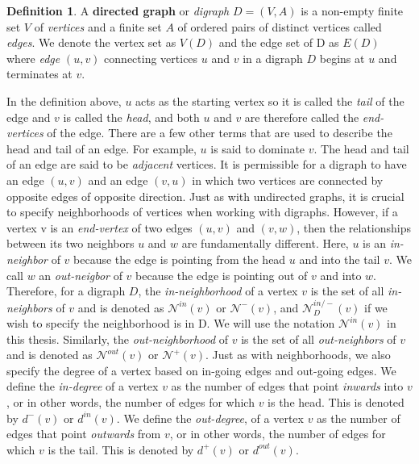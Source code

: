 \documentclass{Dissertate}
\theoremstyle{definition}
\theoremstyle{definition} %
\theoremstyle{definition}
\newtheorem{definition}[theorem]{Definition}
\begin{document}
\begin{definition}
    A \textbf{directed graph} or \textit{digraph} $D = (V, A)$ is a non-empty finite set $V$ of \textit{vertices} and a finite set $A$ of ordered pairs of distinct vertices called \textit{edges}. We denote the vertex set as $V(D)$ and the edge set of D as $E(D)$ where \textit{edge} $(u,v)$ connecting vertices $u$ and $v$ in a digraph $D$ begins at $u$ and terminates at $v$.
\end{definition}

In the definition above, $u$ acts as the starting vertex so it is called the \textit{tail} of the edge and $v$ is called the \textit{head}, and both $u$ and $v$ are therefore called the \textit{end-vertices} of the edge. There are a few other terms that are used to describe the head and tail of an edge. For example, $u$ is said to dominate $v$. The head and tail of an edge are said to be \textit{adjacent} vertices. It is permissible for a digraph to have an edge $(u,v)$ and an edge $(v,u)$ in which two vertices are connected by opposite edges of opposite direction. Just as with undirected graphs, it is crucial to specify neighborhoods of vertices when working with digraphs. However, if a vertex v is an \textit{end-vertex} of two edges $(u,v)$ and $(v,w)$, then the relationships between its two neighbors $u$ and $w$ are fundamentally different. Here, $u$ is an \textit{in-neighbor} of $v$ because the edge is pointing from the head $u$ and into the tail $v$. We call $w$ an \textit{out-neigbor} of $v$ because the edge is pointing out of $v$ and into $w$. Therefore, for a digraph $D$, the \textit{in-neighborhood} of a vertex $v$ is the set of all \textit{in-neighbors} of $v$ and is denoted as $\mathcal{N}^{in}(v)$ or $\mathcal{N}^{-}(v)$, and  $\mathcal{N}^{in/-}_D(v)$ if we wish to specify the neighborhood is in D. We will use the notation $\mathcal{N}^{in}(v)$ in this thesis. Similarly, the \textit{out-neighborhood} of $v$ is the set of all \textit{out-neighbors} of $v$ and is denoted as $\mathcal{N}^{out}(v)$ or $\mathcal{N}^{+}(v)$. Just as with neighborhoods, we also specify the degree of a vertex based on in-going edges and out-going edges. We define the \textit{in-degree} of a vertex $v$ as the number of edges that point \textit{inwards} into $v$, or in other words, the number of edges for which $v$ is the head. This is denoted by $d^{-}(v)$ or $d^{in}(v)$. We define the \textit{out-degree}, of a vertex $v$ as the number of edges that point \textit{outwards} from $v$, or in other words, the number of edges for which $v$ is the tail. This is denoted by $d^{+}(v)$ or $d^{out}(v)$. 
\end{document}
